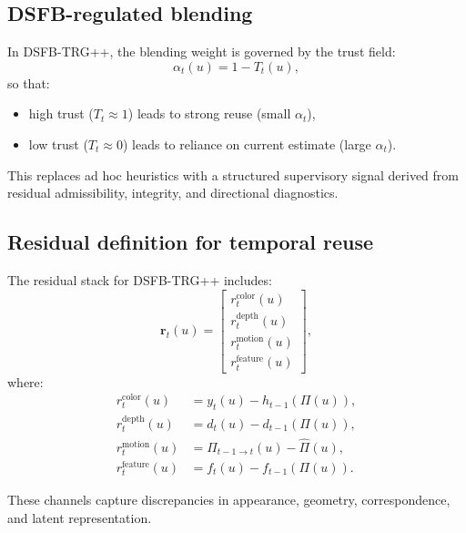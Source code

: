 \documentclass[11pt]{article}
\theoremstyle{definition}
\theoremstyle{plain}
\begin{document}
\subsection{DSFB-regulated blending}

In DSFB-TRG++, the blending weight is governed by the trust field:
\begin{equation}
\alpha_t(u)=1 - T_t(u),
\end{equation}
so that:
\begin{itemize}[leftmargin=1.5em]
    \item high trust ($T_t\approx 1$) leads to strong reuse (small $\alpha_t$),
    \item low trust ($T_t\approx 0$) leads to reliance on current estimate (large $\alpha_t$).
\end{itemize}

This replaces ad hoc heuristics with a structured supervisory signal derived from residual admissibility, integrity, and directional diagnostics.


\subsection{Residual definition for temporal reuse}

The residual stack for DSFB-TRG++ includes:
\begin{equation}
\mathbf r_t(u)=
\begin{bmatrix}
r^{\mathrm{color}}_t(u)\\
r^{\mathrm{depth}}_t(u)\\
r^{\mathrm{motion}}_t(u)\\
r^{\mathrm{feature}}_t(u)
\end{bmatrix},
\end{equation}
where:
\begin{align}
r^{\mathrm{color}}_t(u) &= y_t(u) - h_{t-1}(\Pi(u)),\\
r^{\mathrm{depth}}_t(u) &= d_t(u) - d_{t-1}(\Pi(u)),\\
r^{\mathrm{motion}}_t(u) &= \Pi_{t-1\rightarrow t}(u) - \hat{\Pi}(u),\\
r^{\mathrm{feature}}_t(u) &= f_t(u) - f_{t-1}(\Pi(u)).
\end{align}

These channels capture discrepancies in appearance, geometry, correspondence, and latent representation.
\end{document}
